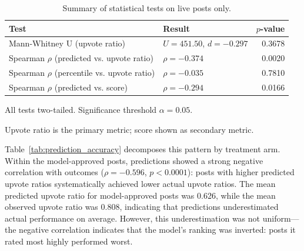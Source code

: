 \begin{table}[htbp]
\centering
\caption{Summary of statistical tests on live posts only.}
\label{tab:statistical_tests}
\begin{threeparttable}
\begin{tabular}{llr}
\toprule
Test & Result & $p$-value \\
\midrule
Mann-Whitney U (upvote ratio) & $U=451.50$, $d=-0.297$ & 0.3678 \\
Spearman $\rho$ (predicted vs. upvote ratio) & $\rho=-0.374$ & 0.0020 \\
Spearman $\rho$ (percentile vs. upvote ratio) & $\rho=-0.035$ & 0.7810 \\
\midrule
Spearman $\rho$ (predicted vs. score) & $\rho=-0.294$ & 0.0166 \\
\bottomrule
\end{tabular}
\begin{tablenotes}
\small
\item All tests two-tailed. Significance threshold $\alpha=0.05$.
\item Upvote ratio is the primary metric; score shown as secondary metric.
\end{tablenotes}
\end{threeparttable}
\end{table}

Table~\ref{tab:prediction_accuracy} decomposes this pattern by treatment arm. Within the model-approved posts, predictions showed a strong negative correlation with outcomes ($\rho = -0.596$, $p < 0.0001$): posts with higher predicted upvote ratios systematically achieved lower actual upvote ratios. The mean predicted upvote ratio for model-approved posts was 0.626, while the mean observed upvote ratio was 0.808, indicating that predictions underestimated actual performance on average. However, this underestimation was not uniform—the negative correlation indicates that the model's ranking was inverted: posts it rated most highly performed worst.

